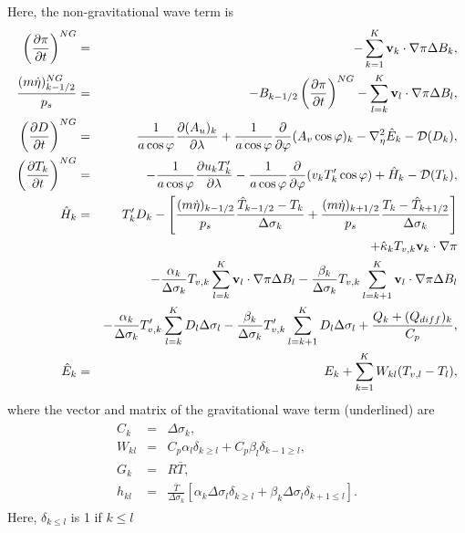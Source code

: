Here, the non-gravitational wave term is \begin{eqnarray}\begin{aligned}
  \left( \frac{\partial \pi}{\partial t} \right)^{NG}
   &=&   - \sum_{k=1}^{K} {\mathbf{v}}_{k} \cdot \nabla \pi
       \Delta B_{k}, \\
  \frac{(m\dot{\eta})^{NG}_{k-1/2}}{p_s}
 &=& - B_{k-1/2} \left( \frac{\partial \pi}{\partial t} \right)^{NG}
   - \sum_{l=k}^{K} {\mathbf{v}}_{l} \cdot \nabla \pi
       \Delta B_{l}, \\
  \left( \frac{\partial D}{\partial t} \right)^{NG}
       &=&   \frac{1}{a\cos\varphi}
            \frac{\partial (A_u)_{k}}{\partial \lambda}
          + \frac{1}{a\cos\varphi}
            \frac{\partial }{\partial \varphi} (A_v \cos\varphi)_k
          - \nabla^{2}_{\eta} \hat{E}_{k}
          - {\mathcal D}(D_{k}), \\
  \left( \frac{\partial T_{k}}{\partial t} \right)^{NG}
      &=&   - \frac{1}{a\cos\varphi}
               \frac{\partial u_k T'_k}{\partial \lambda}
          - \frac{1}{a\cos\varphi}
               \frac{\partial }{\partial \varphi} (v_k T'_k \cos\varphi)
          + \hat{H}_{k}
          - {\mathcal D}(T_{k}), \\
 \hat{H}_k  &=&  T_{k}^{\prime} D_{k} - \left[   \frac{(m\dot{\eta})_{k-1/2}}{p_s} \frac{\hat{T}_{k-1/2} - T_k}{\Delta\sigma_k}
               + \frac{(m\dot{\eta})_{k+1/2}}{p_s} \frac{T_k - \hat{T}_{k+1/2}}{\Delta\sigma_k} \right] \notag\\
         &&+ \hat{\kappa}_{k} T_{v,k} {\mathbf{v}}_{k} \cdot \nabla \pi \notag\\
         &&- \frac{\alpha_{k}}{\Delta \sigma_{k} } T_{v,k}
             \sum_{l=k}^{K} {\mathbf{v}}_{l} \cdot \nabla \pi
               \Delta B_{l}
           - \frac{\beta_{k}}{\Delta \sigma_{k} } T_{v,k}
             \sum_{l=k+1}^{K} {\mathbf{v}}_{l} \cdot \nabla \pi
               \Delta B_{l} \notag\\
        &&- \frac{\alpha_{k}}{\Delta \sigma_{k} } T'_{v,k}
             \sum_{l=k}^{K} D_l  \Delta \sigma_{l}
           - \frac{\beta_{k}}{\Delta \sigma_{k} } T'_{v,k}
             \sum_{l=k+1}^{K} D_l  \Delta \sigma_{l}
         + \frac{Q_k + (Q_{diff})_k}{C_p}, \\
  \hat{E}_k &=& E_{k}
            + \sum_{k=1}^{K} W_{kl} ( T_{v,l}-T_{l} ),\end{aligned}\end{eqnarray} where the vector and matrix of the gravitational wave term (underlined) are \begin{eqnarray}\begin{aligned}
  C_{k} &=& \Delta \sigma_{k}, \\
  W_{kl} &=& C_{p} \alpha_{l} \delta_{k \geq l}
         + C_{p} \beta_{l} \delta_{k-1 \geq l}, \\
  G_{k} &=& R\bar{T}, \\
h_{kl} &=& \frac{\bar{T}}{\Delta\sigma_k}\left[\alpha_k \Delta\sigma_l \delta_{k\ge l}+\beta_k \Delta\sigma_l \delta_{k+1\le l}\right].\end{aligned}\end{eqnarray} Here, \(\delta_{k \leq l}\) is 1 if \(k \leq l\)
